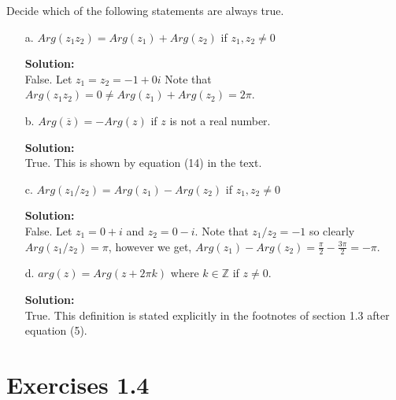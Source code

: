 \documentclass[12pt]{article}
\makeatletter
\theoremstyle{homework}
\newenvironment{exercise}[1]
{\def\@currentlabel{#1}\exercisecore}
{\endexercisecore}
\newcommand{\localhead}[1]{\par\smallskip\noindent\textbf{#1}\nobreak\\}%
\newcommand\solution{\localhead{Solution:}}
\makeatother
\begin{document}
\begin{exercise}{13} Decide which of the following statements are always true.\\
    \begin{enumerate}
        \item[a.] $Arg(z_1z_2) = Arg(z_1) + Arg(z_2)$ if $z_1, z_2 \neq 0$\\
        \solution False. Let $z_1 = z_2 = -1 + 0i$ Note that $Arg(z_1z_2) = 0 \neq Arg(z_1) + Arg(z_2) = 2\pi$.
        \item[b.] $Arg(\overline{z}) = -Arg(z)$ if $z$ is not a real number.
        \solution True. This is shown by equation (14) in the text.  
        \item[c.] $Arg(z_1/z_2) = Arg(z_1) - Arg(z_2)$ if $z_1, z_2 \neq 0$\\
        \solution False. Let $z_1 = 0 + i$ and $z_2 = 0 - i$. Note that $z_1/z_2 = -1$ so clearly $Arg(z_1/z_2) = \pi$, however we get, 
        $ Arg(z_1) - Arg(z_2) = \frac{\pi}{2} - \frac{3\pi}{2} = -\pi$.
        \item[d.] $arg(z) = Arg(z + 2\pi k)$ where $k \in \mathbb{Z}$ if $z \neq 0$.\\
        \solution True. This definition is stated explicitly in the footnotes of section 1.3 after equation (5).  
    \end{enumerate}
\end{exercise}


\newpage
\section*{Exercises 1.4}
\end{document}
